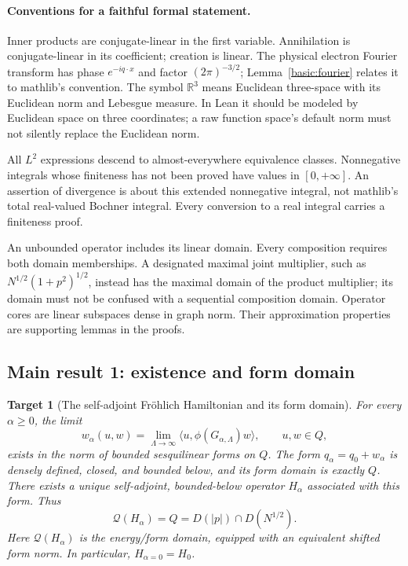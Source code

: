 \documentclass[11pt,a4paper]{article}
\newtheorem{target}{Target}
\theoremstyle{definition}
\theoremstyle{remark}
\begin{document}
\paragraph{Conventions for a faithful formal statement.}
Inner products are conjugate-linear in the first variable. Annihilation
is conjugate-linear in its coefficient; creation is linear. The physical
electron Fourier transform has phase $e^{-iq\cdot x}$ and factor
$(2\pi)^{-3/2}$; Lemma~\ref{basic:fourier} relates it to mathlib's convention.
The symbol $\mathbb R^3$ means Euclidean three-space with its Euclidean
norm and Lebesgue measure. In Lean it should be modeled by Euclidean
space on three coordinates; a raw function space's default norm must not
silently replace the Euclidean norm.

All $L^2$ expressions descend to almost-everywhere equivalence classes.
Nonnegative integrals whose finiteness has not been proved have values
in $[0,+\infty]$. An assertion of divergence is about this extended
nonnegative integral, not mathlib's total real-valued Bochner integral.
Every conversion to a real integral carries a finiteness proof.

An unbounded operator includes its linear domain. Every composition
requires both domain memberships. A designated maximal joint multiplier,
such as $N^{1/2}(1+p^2)^{1/2}$, instead has the maximal domain of the
product multiplier; its domain must not be confused with a sequential
composition domain. Operator cores are linear subspaces dense in graph
norm. Their approximation properties are supporting lemmas in the proofs.

\subsection{Main result 1: existence and form domain}

\begin{target}[The self-adjoint Fr\"ohlich Hamiltonian and its form domain]
\label{target:construction}
For every $\alpha\geq0$, the limit
\[
 w_\alpha(u,w)=\lim_{\Lambda\to\infty}
       \langle u,\phi(G_{\alpha,\Lambda})w\rangle,\qquad u,w\in Q,
\]
exists in the norm of bounded sesquilinear forms on $Q$.
The form $q_\alpha=q_0+w_\alpha$ is densely defined, closed, and bounded
below, and its form domain is exactly $Q$.
There exists a unique self-adjoint, bounded-below operator $H_\alpha$
associated with this form. Thus
\[
 \boxed{\ \mathcal Q(H_\alpha)=Q=D(|p|)\cap D(N^{1/2}).\ }
\]
Here $\mathcal Q(H_\alpha)$ is the energy/form domain, equipped with an
equivalent shifted form norm. In particular, $H_{\alpha=0}=H_0$.
\end{target}
\end{document}
